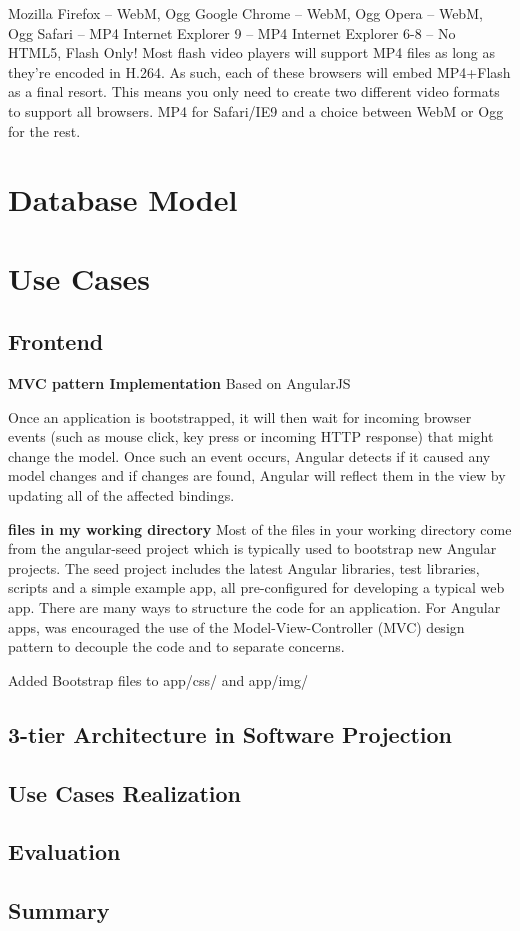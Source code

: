 	Mozilla Firefox – WebM, Ogg
	Google Chrome – WebM, Ogg
	Opera – WebM, Ogg
	Safari – MP4
	Internet Explorer 9 – MP4
	Internet Explorer 6-8 – No HTML5, Flash Only!
	Most flash video players will support MP4 files as long as they’re encoded in H.264. As such, each of these browsers will embed MP4+Flash as a final resort. This means you only need to create two different video formats to support all browsers. MP4 for Safari/IE9 and a choice between WebM or Ogg for the rest.

\section{Database Model}

\section{Use Cases}

  \subsection{Frontend}
  \textbf{MVC pattern Implementation}
  Based on AngularJS

  Once an application is bootstrapped, it will then wait for incoming browser events (such as mouse click, key press or incoming HTTP response) that might change the model. Once such an event occurs, Angular detects if it caused any model changes and if changes are found, Angular will reflect them in the view by updating all of the affected bindings.

  \textbf{files in my working directory}
Most of the files in your working directory come from the angular-seed project which is typically used to bootstrap new Angular projects. The seed project includes the latest Angular libraries, test libraries, scripts and a simple example app, all pre-configured for developing a typical web app.
There are many ways to structure the code for an application. For Angular apps, was encouraged the use of the Model-View-Controller (MVC) design pattern to decouple the code and to separate concerns. 

Added Bootstrap files to app/css/ and app/img/
  \subsection{3-tier Architecture in Software Projection}
  \subsection{Use Cases Realization}
  \subsection{Evaluation}


\subsection{Summary}